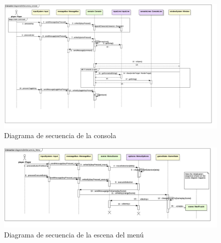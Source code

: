 \begin{landscape}
\begin{figure}
	\hspace*{-3cm}  
	\includegraphics[width=24cm]{otros/UML/png/alld/png/CasosDeUso__Especifico__Collaboration4__Interaction1__diagramaDeSecuencia_consola_20.png}
	\caption{Diagrama de secuencia de la consola}
	\label{sec:console}

\end{figure}
\end{landscape}

\begin{landscape}
\begin{figure}
	\hspace*{-3cm}  
	\includegraphics[width=24cm]{otros/UML/png/alld/png/CasosDeUso__Especifico__Collaboration1__Interaction1__diagramaDeSecuencia_Menu_17.png}
	\caption{Diagrama de secuencia de la escena del menú}
	\label{sec:menu}

\end{figure}
\end{landscape}


